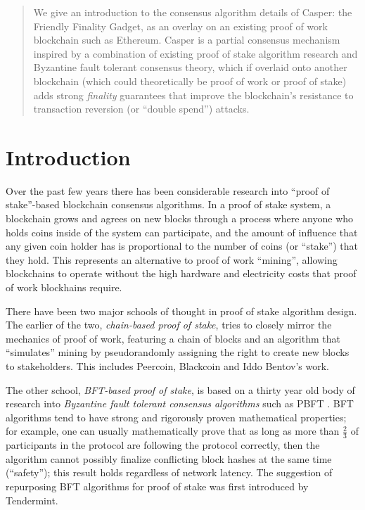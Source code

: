 \documentclass[12pt, final]{article}
\begin{document}
\maketitle

\begin{abstract}
We give an introduction to the consensus algorithm details of Casper: the Friendly Finality Gadget, as an overlay on an existing proof of work blockchain such as Ethereum. Casper is a partial consensus mechanism inspired by a combination of existing proof of stake algorithm research and Byzantine fault tolerant consensus theory, which if overlaid onto another blockchain (which could theoretically be proof of work or proof of stake) adds strong \textit{finality} guarantees that improve the blockchain's resistance to transaction reversion (or ``double spend'') attacks.
\end{abstract}

\section{Introduction}
\label{sect:intro}

Over the past few years there has been considerable research into ``proof of stake''-based blockchain consensus algorithms. In a proof of stake system, a blockchain grows and agrees on new blocks through a process where anyone who holds coins inside of the system can participate, and the amount of influence that any given coin holder has is proportional to the number of coins (or ``stake'') that they hold. This represents an alternative to proof of work ``mining'', allowing blockchains to operate without the high hardware and electricity costs that proof of work blockhains require.

There have been two major schools of thought in proof of stake algorithm design. The earlier of the two, \textit{chain-based proof of stake}, tries to closely mirror the mechanics of proof of work, featuring a chain of blocks and an algorithm that ``simulates'' mining by pseudorandomly assigning the right to create new blocks to stakeholders. This includes Peercoin\cite{king2012ppcoin}, Blackcoin\cite{vasin2014blackcoin} and Iddo Bentov's work\cite{bentov2016pos}.

The other school, \textit{BFT-based proof of stake}, is based on a thirty year old body of research into \textit{Byzantine fault tolerant consensus algorithms} such as PBFT \cite{castro1999practical}. BFT algorithms tend to have strong and rigorously proven mathematical properties; for example, one can usually mathematically prove that as long as more than $\frac{2}{3}$ of participants in the protocol are following the protocol correctly, then the algorithm cannot possibly finalize conflicting block hashes at the same time (``safety''); this result holds regardless of network latency. The suggestion of repurposing BFT algorithms for proof of stake was first introduced by Tendermint\cite{kwon2014tendermint}.
\end{document}
